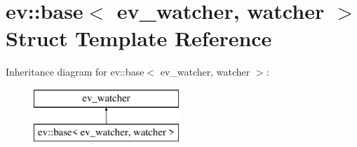 \hypertarget{structev_1_1base}{}\section{ev\+:\+:base$<$ ev\+\_\+watcher, watcher $>$ Struct Template Reference}
\label{structev_1_1base}
Inheritance diagram for ev\+:\+:base$<$ ev\+\_\+watcher, watcher $>$\+:\begin{figure}[H]
\begin{center}
\leavevmode
\includegraphics[height=2.000000cm]{structev_1_1base}
\end{center}
\end{figure}
